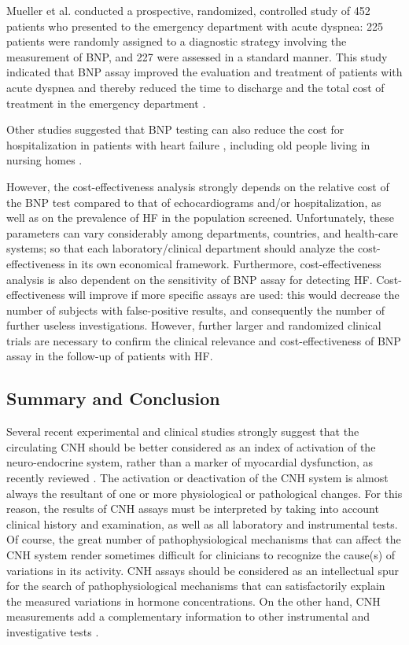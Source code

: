 \documentclass[14pt,a4paper,onecolumn]{extarticle}
\begin{document}
Mueller et al. \citep{bib3265} conducted a prospective, randomized, controlled study of 452
patients who presented to the emergency department with acute dyspnea: 225 patients
were randomly assigned to a diagnostic strategy involving the measurement of BNP,
and 227 were assessed in a standard manner. This study indicated that BNP assay improved
the evaluation and treatment of patients with acute dyspnea and thereby reduced the
time to discharge and the total cost of treatment in the emergency department \citep{bib3265}.

Other studies suggested that BNP testing can also reduce the cost for hospitalization in
patients with heart failure \citep{bib3263} \citep{bib3264}, including old people living in nursing homes \citep{bib3147}.

However, the cost-effectiveness analysis strongly depends on the relative cost of the
BNP test compared to that of echocardiograms and/or hospitalization, as well as on
the prevalence of HF in the population screened. Unfortunately, these parameters can
vary considerably among departments, countries, and health-care systems; so that each
laboratory/clinical department should analyze the cost-effectiveness in its own economical framework. Furthermore, cost-effectiveness analysis is also dependent on the
sensitivity of BNP assay for detecting HF. Cost-effectiveness will improve if more specific assays are used: this would decrease the number of subjects with false-positive
results, and consequently the number of further useless investigations. However, further
larger and randomized clinical trials are necessary to confirm the clinical relevance
and cost-effectiveness of BNP assay in the follow-up of patients with HF.

\subsection{ Summary and Conclusion}

Several recent experimental and clinical studies strongly suggest that the circulating
CNH should be better considered as an index of activation of the neuro-endocrine system, rather than a marker of myocardial dysfunction, as recently reviewed \citep{bib3298}. The activation or deactivation of the CNH system is almost always the resultant of one or more
physiological or pathological changes. For this reason, the results of CNH assays must
be interpreted by taking into account clinical history and examination, as well as all
laboratory and instrumental tests. Of course, the great number of pathophysiological
mechanisms that can affect the CNH system render sometimes difficult for clinicians
to recognize the cause(s) of variations in its activity. CNH assays should be considered
as an intellectual spur for the search of pathophysiological mechanisms that can satisfactorily explain the measured variations in hormone concentrations. On the other
hand, CNH measurements add a complementary information to other instrumental
and investigative tests \citep{bib3296}.
\end{document}
